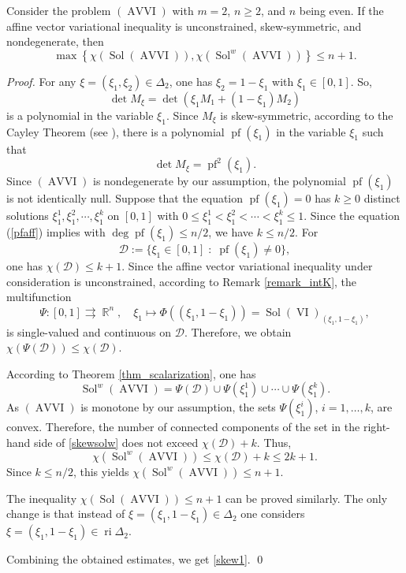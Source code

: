 \documentclass[smallextended,envcountsect]{svjour3}       %
\DeclareMathOperator{\Sol}{Sol}
\DeclareMathOperator{\AVVI}{AVVI}
\DeclareMathOperator{\pf}{pf}
\DeclareMathOperator{\VI}{VI}
\DeclareMathOperator{\ri}{ri}
\DeclareMathOperator{\R}{\mathbb{R}}
\begin{document}
\begin{theorem}\label{skew}
Consider the problem $(\AVVI)$ with $m=2$, $n\geq 2$, and $n$ being even. If the affine vector variational inequality is unconstrained, skew-symmetric, and nondegenerate, then
	\begin{equation}\label{skew1}
\max\left\lbrace \chi(\Sol(\AVVI)),\chi(\Sol^w(\AVVI)) \right\rbrace \leq n+1.
	\end{equation}
\end{theorem}
\begin{proof} For any $\xi=(\xi_1,\xi_2)\in \Delta_2$, one has $\xi_2=1-\xi_1$ with $\xi_1\in [0,1]$. So, $$\det M_{\xi}=\det\left(\xi_1M_1+(1-\xi_1)M_2\right)$$ is a polynomial in the variable $\xi_1$. Since $M_{\xi}$ is skew-symmetric, according to the Cayley Theorem (see \cite[p.~305]{Lax2007}), there is a polynomial $\pf(\xi_1)$ in the variable $\xi_1$ such that 
	\begin{equation}\label{pfaff}
	\det M_{\xi}=\pf^2(\xi_1).
	\end{equation}
Since $(\AVVI)$ is nondegenerate by our assumption, the polynomial $\pf(\xi_1)$ is not identically null. Suppose that the equation $\pf(\xi_1)=0$ has $k\geq 0$ distinct solutions $\xi_1^1,\xi_1^2,\cdots,\xi_1^{k}$ on $[0,1]$ with $0\leq \xi_1^1<\xi_1^2<\cdots <\xi_1^{k}\leq 1.$ Since the equation (\ref{pfaff}) implies with $\deg\pf(\xi_1)\leq n/2$, we have  $k\leq n/2$. For $$\mathcal{D}:=\{\xi_1\in [0,1]\;:\;\pf(\xi_1)\neq 0\},$$ one has $\chi(\mathcal{D})\leq k+1$. 	
Since  the affine vector variational inequality under consideration is unconstrained, according to Remark \ref{remark_intK}, the multifunction $$\Psi: [0,1]\rightrightarrows\R^n,\quad  \xi_1\mapsto \Phi((\xi_1,1-\xi_1))=\Sol(\VI)_{(\xi_1,1-\xi_1)},$$ is single-valued and continuous on $\mathcal{D}$. Therefore, we obtain $\chi(\Psi(\mathcal{D}))\leq \chi(\mathcal{D})$. 

According to Theorem \ref{thm_scalarization}, one has \begin{equation}\label{skewsolw}
	\Sol^w(\AVVI)=\Psi(\mathcal{D})\cup\Psi(\xi^1_1)\cup\cdots\cup\Psi(\xi^k_1).
	\end{equation}
As $(\AVVI)$ is monotone by our assumption, the sets $\Psi(\xi^i_1)$, $i=1,\dots,k$, are convex. Therefore, the number of connected components of the set in the right-hand side of
\eqref{skewsolw} does not exceed $\chi(\mathcal{D}) +k$. Thus, $$\chi(\Sol^w(\AVVI))\leq \chi(\mathcal{D}) +k\leq 2k+1.$$
Since $k\leq n/2$, this yields $\chi(\Sol^w(\AVVI))\leq n+1.$ 

The inequality $\chi(\Sol(\AVVI))\leq n+1$ can be proved similarly. The only change is that instead of $\xi=(\xi_1,1-\xi_1)\in\Delta_2$ one considers $\xi=(\xi_1,1-\xi_1)\in\ri\Delta_2$. 

Combining the obtained estimates, we get \eqref{skew1}.
\qed
\end{proof}
\end{document}
